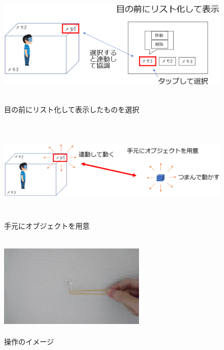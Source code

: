 \documentclass[11pt,a4j, titlepage]{jarticle} %
\begin{document}
\begin{figure}[H]
  \begin{center}
    \includegraphics[clip,height=6.0cm,width=14.0cm]{./3d_rubber_band.eps}
    \caption{目の前にリスト化して表示したものを選択}
    \label{fig:3d_rubber_band}
  \end{center}
\end{figure}

\begin{figure}[H]
  \begin{center}
    \includegraphics[clip,height=5.0cm,width=16.0cm]{./3d_rubber_band2.eps}
    \caption{手元にオブジェクトを用意}
    \label{fig:3d_rubber_band2}
  \end{center}
\end{figure}

\begin{figure}[H]
  \begin{center}
    \includegraphics[clip,height=5.0cm,width=7.0cm]{./3d_rubber_band3.eps}
    \caption{操作のイメージ}
    \label{fig:3d_rubber_band3}
  \end{center}
\end{figure}
\end{document}
